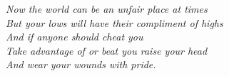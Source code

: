 \thispagestyle{empty}
\begin{flushright}
\vfill
\textit{Now the world can be an unfair place at times\\
But your lows will have their compliment of highs\\
And if anyone should cheat you\\
Take advantage of or beat you raise your head\\
And wear your wounds with pride.}
\vfill
\end{flushright}%
